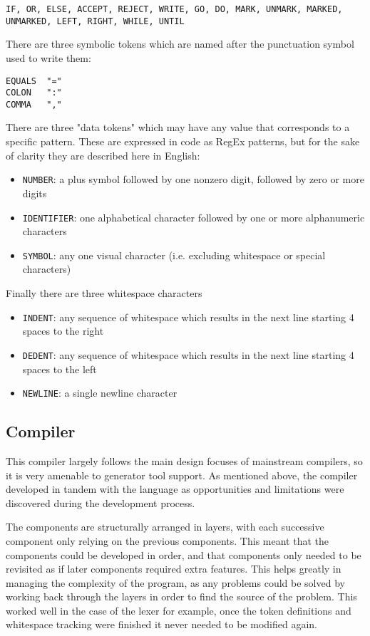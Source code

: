 \documentclass[11pt]{article}
\begin{document}
\texttt{IF, OR, ELSE, ACCEPT, REJECT, WRITE, GO, DO, MARK, UNMARK, MARKED, UNMARKED, LEFT, RIGHT, WHILE, UNTIL}

There are three symbolic tokens which are named after the punctuation symbol used to write them:
\begin{verbatim}
EQUALS  "="
COLON   ":"
COMMA   ","
\end{verbatim}

There are three "data tokens" which may have any value that corresponds to a specific pattern. These are expressed in code as RegEx patterns, but for the sake of clarity they are described here in English:
\begin{itemize}
    \item\texttt{NUMBER}: a plus symbol followed by one nonzero digit, followed by zero or more digits
    \item\texttt{IDENTIFIER}: one alphabetical character followed by one or more alphanumeric characters
    \item\texttt{SYMBOL}: any one visual character (i.e. excluding whitespace or special characters)
\end{itemize}

Finally there are three whitespace characters
\begin{itemize}
    \item\texttt{INDENT}: any sequence of whitespace which results in the next line starting 4 spaces to the right
    \item\texttt{DEDENT}: any sequence of whitespace which results in the next line starting 4 spaces to the left
    \item\texttt{NEWLINE}: a single newline character
\end{itemize}

\subsection{Compiler}

This compiler largely follows the main design focuses of mainstream compilers, so it is very amenable to generator tool support. As mentioned above, the compiler developed in tandem with the language as opportunities and limitations were discovered during the development process.

The components are structurally arranged in layers, with each successive component only relying on the previous components. This meant that the components could be developed in order, and that components only needed to be revisited as if later components required extra features. This helps greatly in managing the complexity of the program, as any problems could be solved by working back through the layers in order to find the source of the problem. This worked well in the case of the lexer for example, once the token definitions and whitespace tracking were finished it never needed to be modified again.
\end{document}
